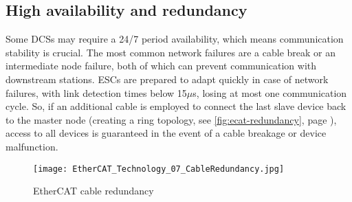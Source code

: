 \subsection{High availability and redundancy}

Some DCSs may require a 24/7 period availability, which means communication stability is crucial.
The most common network failures are a cable break or an intermediate node failure, both of which can prevent communication with downstream stations.
ESCs are prepared to adapt quickly in case of network failures, with link detection times below 15$\mu$s, losing at most one communication cycle.
So, if an additional cable is employed to connect the last slave device back to the master node (creating a ring topology, see \autoref{fig:ecat-redundancy}, page \pageref{fig:ecat-redundancy}), access to all devices is guaranteed in the event of a cable breakage or device malfunction.

\begin{figure}[htp]
	\centering
	\texttt{[image: EtherCAT\_Technology\_07\_CableRedundancy.jpg]}
	\caption{EtherCAT cable redundancy \cite{protocol:ethercat}}
	\label{fig:ecat-redundancy}
\end{figure}


